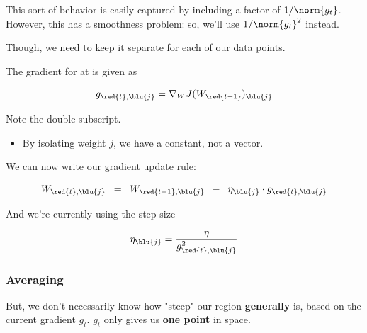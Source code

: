             This sort of behavior is easily captured by including a factor of $1/\norm{g_t}$. However, this has a smoothness problem: so, we'll use $1/\norm{g_t}^2$ instead.

            Though, we need to keep it separate for each of our data points.\\

            \begin{notation}
                The gradient for  at  is given as 

                \begin{equation*}
                    g_{\red{t},\blu{j}} = \nabla_W J(W_{\red{t-1}})_{\blu{j}}
                \end{equation*}

                Note the double-subscript.

                \subsecdiv

                \begin{itemize}
                    \item By isolating weight $j$, we have a constant, not a vector.
                \end{itemize}
            \end{notation}

            We can now write our gradient update rule:

            \begin{equation}
                W_{\red{t},\blu{j}} \;\;=\;\; 
                W_{\red{t-1},\blu{j}} \;\;-\;\; 
                \eta_{\blu{j}} \cdot g_{\red{t},\blu{j}}
            \end{equation}

            And we're currently using the step size

            \begin{equation}
                \eta_{\blu{j}} = \frac{\eta}{g_{\red{t},\blu{j}}^2}
            \end{equation}

        \subsubsection{Averaging}

            But, we don't necessarily know how "steep" our region \textbf{generally} is, based on the current gradient $g_t$. $g_t$ only gives us \textbf{one point} in space.
            
